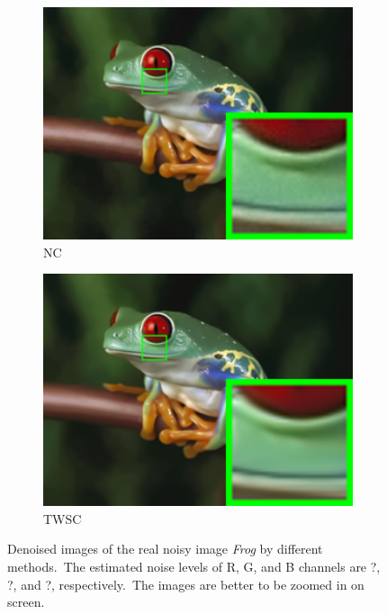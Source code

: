 \begin{figure}
\begin{subfigure}[t]{0.24\textwidth}
        \includegraphics[width=1\textwidth]{images/twsc/nc/resize_br_NC_frog.png}
		\caption{NC}
    \end{subfigure}
    \hfill
    \begin{subfigure}[t]{0.24\textwidth}
        \centering
        \includegraphics[width=1\textwidth]{images/twsc/nc/resize_br_TWSC_frog.png}
		\caption{TWSC}
    \end{subfigure}
    \caption{Denoised images of the real noisy image \textsl{Frog} \cite{ncwebsite} by different methods.\ The estimated noise levels of R, G, and B channels are ?, ?, and ?, respectively.\ The images are better to be zoomed in on screen.}
    \label{fig3}
\end{figure}


